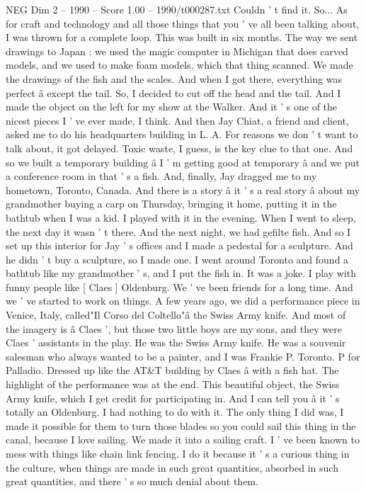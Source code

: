 \begin{textsample}{NEG Dim 2 – 1990 – Score 1.00 – 1990/t000287.txt}
Couldn ' t find it.
So...
As for craft and technology and all those things that you ' ve all been talking about, I was thrown for a complete loop.
This was built in six months.
The way we sent drawings to Japan : we used the magic computer in Michigan that does carved models, and we used to make foam models, which that thing scanned.
We made the drawings of the fish and the scales.
And when I got there, everything was perfect â except the tail.
So, I decided to cut off the head and the tail.
And I made the object on the left for my show at the Walker.
And it ' s one of the nicest pieces I ' ve ever made, I think.
And then Jay Chiat, a friend and client, asked me to do his headquarters building in L.
A.
For reasons we don ' t want to talk about, it got delayed.
Toxic waste, I guess, is the key clue to that one.
And so we built a temporary building â I ' m getting good at temporary â and we put a conference room in that ' s a fish.
And, finally, Jay dragged me to my hometown, Toronto, Canada.
And there is a story â it ' s a real story â about my grandmother buying a carp on Thursday, bringing it home, putting it in the bathtub when I was a kid.
I played with it in the evening.
When I went to sleep, the next day it wasn ' t there.
And the next night, we had gefilte fish.
And so I set up this interior for Jay ' s offices and I made a pedestal for a sculpture.
And he didn ' t buy a sculpture, so I made one.
I went around Toronto and found a bathtub like my grandmother ' s, and I put the fish in.
It was a joke.
I play with funny people like [ Claes ] Oldenburg.
We ' ve been friends for a long time.
And we ' ve started to work on things.
A few years ago, we did a performance piece in Venice, Italy, called"Il Corso del Coltello"â the Swiss Army knife.
And most of the imagery is â Claes ', but those two little boys are my sons, and they were Claes ' assistants in the play.
He was the Swiss Army knife.
He was a souvenir salesman who always wanted to be a painter, and I was Frankie P.
Toronto.
P for Palladio.
Dressed up like the AT\&T building by Claes â with a fish hat.
The highlight of the performance was at the end.
This beautiful object, the Swiss Army knife, which I get credit for participating in.
And I can tell you â it ' s totally an Oldenburg.
I had nothing to do with it.
The only thing I did was, I made it possible for them to turn those blades so you could sail this thing in the canal, because I love sailing.
We made it into a sailing craft.
I ' ve been known to mess with things like chain link fencing.
I do it because it ' s a curious thing in the culture, when things are made in such great quantities, absorbed in such great quantities, and there ' s so much denial about them.

\end{textsample}
